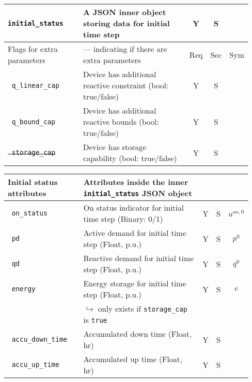 \documentclass{article}
\begin{document}
\begin{center}
\begin{tabular}{ l | l | c | c | c |}
  {\tt initial\_status} & A JSON inner object storing data for initial time step & Y & S &  \\
   \hline
   Flags for extra parameters & --- indicating if there are extra parameters & Req & Sec & Sym\\
   \hline
     {\tt\color{red} q\_linear\_cap}      & Device has additional reactive constraint (bool: true/false) & Y & S & \\
  {\tt\color{red} q\_bound\_cap}       & Device has additional reactive bounds (bool: true/false) & Y & S & \\
  \sout{\tt\color{red} storage\_cap}       & Device has storage capability (bool: true/false) & Y & S & \\
  \hline   
\end{tabular}
\end{center}

\begin{center}
\small
\begin{tabular}{ l | l | c | c | c |}
\hline
  Initial status attributes &  Attributes inside the inner {\tt initial\_status} JSON object &  &  & \\
  \hline    
  {\tt\color{red} on\_status} & On status indicator for initial time step (Binary: 0/1) & Y & S & $u^{on,0}$\\
  {\tt\color{red} pd} & Active demand for initial time step (Float, p.u.) & Y & S & $p^0$ \\
  {\tt\color{red} qd} & Reactive demand for initial time step (Float, p.u.)& Y & S & $q^0$ \\
  {\tt\color{red} energy} & Energy storage for initial time step (Float, p.u.)& Y & S & $e$\\  
                          & $\hookrightarrow$ only exists if \texttt{storage\_cap} is \texttt{true} & & & \\  
  {\tt\color{red} accu\_down\_time} & Accumulated down time (Float, hr) & Y & S & \\  
  {\tt\color{red} accu\_up\_time} & Accumulated up time (Float, hr) & Y & S & \\  
 \hline
\end{tabular}
\end{center}
\end{document}
